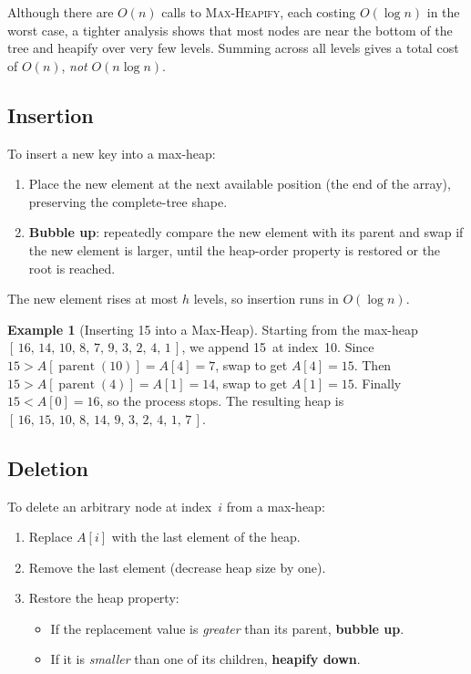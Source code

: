 \documentclass[11pt, a4paper, notitlepage]{report}
\theoremstyle{definition}
\theoremstyle{remark}
\theoremstyle{definition}
\newtheorem{example}[theorem]{Example}
\begin{document}
\begin{keyresult}[title={Key Result: Build-Heap is $O(n)$}]
Although there are $O(n)$ calls to \textsc{Max-Heapify}, each costing $O(\log n)$ in the worst case, a tighter analysis shows that most nodes are near the bottom of the tree and heapify over very few levels.  Summing across all levels gives a total cost of $O(n)$, \emph{not} $O(n\log n)$.
\end{keyresult}

\subsection{Insertion}
\label{subsec:heap-insert}

To insert a new key into a max-heap:
\begin{enumerate}
  \item Place the new element at the next available position (the end of the array), preserving the complete-tree shape.
  \item \textbf{Bubble up}: repeatedly compare the new element with its parent and swap if the new element is larger, until the heap-order property is restored or the root is reached.
\end{enumerate}

The new element rises at most $h$ levels, so insertion runs in $O(\log n)$.

\begin{example}[Inserting 15 into a Max-Heap]
\label{ex:heap-insert}
Starting from the max-heap $[\,16,\,14,\,10,\,8,\,7,\,9,\,3,\,2,\,4,\,1\,]$, we append 15~at index~10.  Since $15 > A[\operatorname{parent}(10)] = A[4] = 7$, swap to get $A[4]=15$.  Then $15 > A[\operatorname{parent}(4)] = A[1] = 14$, swap to get $A[1]=15$.  Finally $15 < A[0] = 16$, so the process stops.  The resulting heap is $[\,16,\,15,\,10,\,8,\,14,\,9,\,3,\,2,\,4,\,1,\,7\,]$.
\end{example}

\subsection{Deletion}
\label{subsec:heap-delete}

To delete an arbitrary node at index~$i$ from a max-heap:
\begin{enumerate}
  \item Replace $A[i]$ with the last element of the heap.
  \item Remove the last element (decrease heap size by one).
  \item Restore the heap property:
  \begin{itemize}
    \item If the replacement value is \emph{greater} than its parent, \textbf{bubble up}.
    \item If it is \emph{smaller} than one of its children, \textbf{heapify down}.
  \end{itemize}
\end{enumerate}
\end{document}

